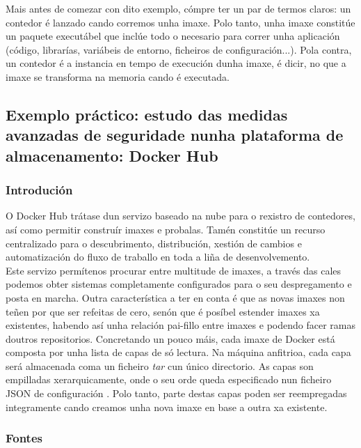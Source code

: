 Mais antes de comezar con dito exemplo, cómpre ter un par de termos claros: un contedor é lanzado cando corremos unha imaxe. Polo tanto, unha imaxe constitúe un paquete executábel que inclúe todo o necesario para correr unha aplicación (código, librarías, variábeis de entorno, ficheiros de configuración...). Pola contra, un contedor é a instancia en tempo de execución dunha imaxe, é dicir, no que a imaxe se transforma na memoria cando é executada. \cite{docker-get-started}\\

\subsection[Exemplo práctico: Docker Hub]{Exemplo práctico: estudo das medidas avanzadas de seguridade nunha plataforma de almacenamento: Docker Hub}

\subsubsection{Introdución}

O Docker Hub trátase dun servizo baseado na nube para o rexistro de contedores, así como permitir construír imaxes e probalas. Tamén constitúe un recurso centralizado para o descubrimento, distribución, xestión de cambios e automatización do fluxo de traballo en toda a liña de desenvolvemento. \cite{dockerHubExp}\\

Este servizo permítenos procurar entre multitude de imaxes, a través das cales podemos obter sistemas completamente configurados para o seu despregamento e posta en marcha. Outra característica a ter en conta é que as novas imaxes non teñen por que ser refeitas de cero, senón que é posíbel estender imaxes xa existentes, habendo así unha relación pai-fillo entre imaxes e podendo facer ramas doutros repositorios. Concretando un pouco máis, cada imaxe de Docker está composta por unha lista de capas de só lectura. Na máquina anfitrioa, cada capa será almacenada coma un ficheiro \textit{tar} cun único directorio. As capas son empilladas xerarquicamente, onde o seu orde queda especificado nun ficheiro \gls{JSON} de configuración  \cite{studySecurityDockerHub}. Polo tanto, parte destas capas poden ser reempregadas integramente cando creamos unha nova imaxe en base a outra xa existente.

\subsubsection{Fontes}

